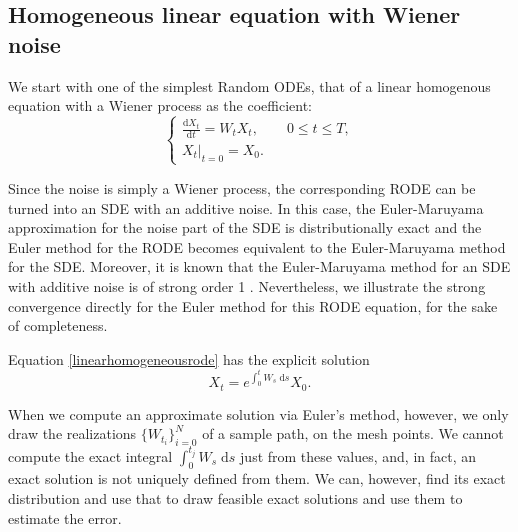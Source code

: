 \documentclass[reqno,12pt]{amsart}
\theoremstyle{plain} %
\theoremstyle{definition} %
\begin{document}
\subsection{Homogeneous linear equation with Wiener noise}
\label{seclinearhomogeneousrode}

We start with one of the simplest Random ODEs, that of a linear homogenous equation with a Wiener process as the coefficient:
\begin{equation}
    \label{linearhomogeneousrode}
    \begin{cases}
        \displaystyle \frac{\mathrm{d}X_t}{\mathrm{d} t} = W_t X_t, \qquad 0 \leq t \leq T, \\
        \left. X_t \right|_{t = 0} = X_0.
      \end{cases}
\end{equation}

Since the noise is simply a Wiener process, the corresponding RODE can be turned into an SDE with an additive noise. In this case, the Euler-Maruyama approximation for the noise part of the SDE is distributionally exact and the Euler method for the RODE becomes equivalent to the Euler-Maruyama method for the SDE. Moreover, it is known that the Euler-Maruyama method for an SDE with additive noise is of strong order 1 \cite{HighamKloeden2021}. Nevertheless, we illustrate the strong convergence directly for the Euler method for this RODE equation, for the sake of completeness.

Equation \eqref{linearhomogeneousrode} has the explicit solution
\begin{equation}
    X_t = e^{\int_0^t W_s \;\mathrm{d}s}X_0.
\end{equation}

When we compute an approximate solution via Euler's method, however, we only draw the realizations $\{W_{t_i}\}_{i=0}^N$ of a sample path, on the mesh points. We cannot compute the exact integral $\int_0^{t_j} W_s\;\mathrm{d}s$ just from these values, and, in fact, an exact solution is not uniquely defined from them. We can, however, find its exact distribution and use that to draw feasible exact solutions and use them to estimate the error.
\end{document}
